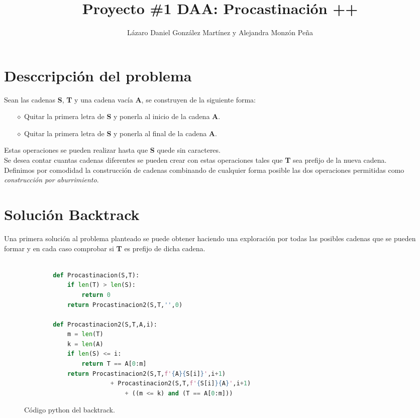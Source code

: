 \documentclass[a4paper]{article}
\begin{document}
    \title{\textbf{Proyecto \#1 DAA:} Procastinaci\'on ++}
    \author{L\'azaro Daniel Gonz\'alez Mart\'inez y Alejandra Monz\'on Pe\~na}
    \date{}
    \maketitle

    \section*{Desccripci\'on del problema}
    Sean las cadenas \textbf{S}, \textbf{T} y una cadena vac\'ia \textbf{A}, se construyen de la siguiente forma: 

    \begin{itemize}
        \item[$\diamond $] Quitar la primera letra de \textbf{S} y ponerla al inicio de la cadena \textbf{A}.
        \item[$\diamond $] Quitar la primera letra de \textbf{S} y ponerla al final de la cadena \textbf{A}.    
    \end{itemize}

    Estas operaciones se pueden realizar hasta que \textbf{S} quede sin caracteres.\\ 

    Se desea contar cuantas cadenas diferentes se pueden crear con estas operaciones tales que \textbf{T} sea prefijo de 
    la nueva cadena.\\ 

    Definimos por comodidad la construcci\'on de cadenas combinando de cualquier forma posible las dos operaciones permitidas como 
    \textit{construcci\'on por aburrimiento}.

    \section*{Soluci\'on Backtrack}
    Una primera soluci\'on al problema planteado se puede obtener haciendo una exploraci\'on por todas las posibles cadenas que se pueden formar 
    y en cada caso comprobar si \textbf{T} es prefijo de dicha cadena. 


	\begin{figure}[htb]
	
    \begin{lstlisting}[language=Python]

        def Procastinacion(S,T):
            if len(T) > len(S):
                return 0
            return Procastinacion2(S,T,'',0)
        
        def Procastinacion2(S,T,A,i):
            m = len(T)
            k = len(A)
            if len(S) <= i:
                return T == A[0:m]
            return Procastinacion2(S,T,f'{A}{S[i]}',i+1) 
                        + Procastinacion2(S,T,f'{S[i]}{A}',i+1) 
                            + ((m <= k) and (T == A[0:m]))
	\end{lstlisting}
	\caption{Código python del backtrack.}
	\end{figure}
\end{document}
